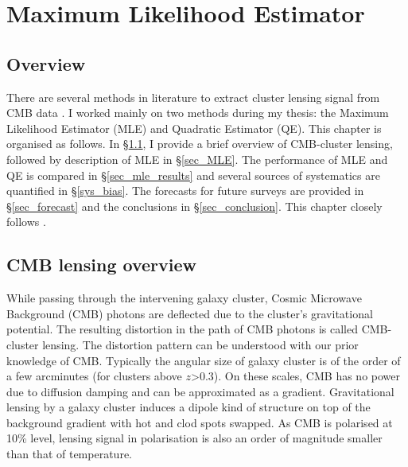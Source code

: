 \chapter{Maximum Likelihood Estimator}
\label{ch:MLE}
\section*{Overview}
There are several methods in literature to extract cluster lensing signal from CMB data \citep{dodelson04, lewis06, baxter15, hu07, melin15,yoo08,horowitz19, raghunathan17a}. 
 I worked mainly on two methods during my thesis: the Maximum Likelihood Estimator (MLE) and Quadratic Estimator (QE). 
This chapter is organised as follows. In \S\ref{cmb_overview}, I provide a brief overview of CMB-cluster lensing, followed by description of MLE in \S\ref{sec_MLE}. The performance of MLE and QE is compared in \S\ref{sec_mle_results} and several sources of systematics are quantified in \S\ref{sys_bias}. The forecasts for future surveys are provided in \S\ref{sec_forecast} and the conclusions in \S\ref{sec_conclusion}. This chapter closely follows \citet{raghunathan17a}.

\section{CMB lensing overview}
\label{cmb_overview}
While passing through the intervening galaxy cluster, Cosmic Microwave Background (CMB) photons are deflected due to the cluster's gravitational potential. 
The resulting distortion in the path of CMB photons is called CMB-cluster lensing. 
The distortion pattern can be understood with our prior knowledge of CMB.
Typically the angular size of galaxy cluster is of the order of a few arcminutes (for clusters above $z$>0.3). On these scales, CMB has no power due to diffusion damping \citep{silk68} and can be approximated as a gradient. 
Gravitational lensing by a galaxy cluster induces a dipole kind of structure on top of the background gradient with hot and clod spots swapped. 
As CMB is polarised at 10\% level, lensing signal in polarisation is also an order of magnitude smaller than that of temperature. 


